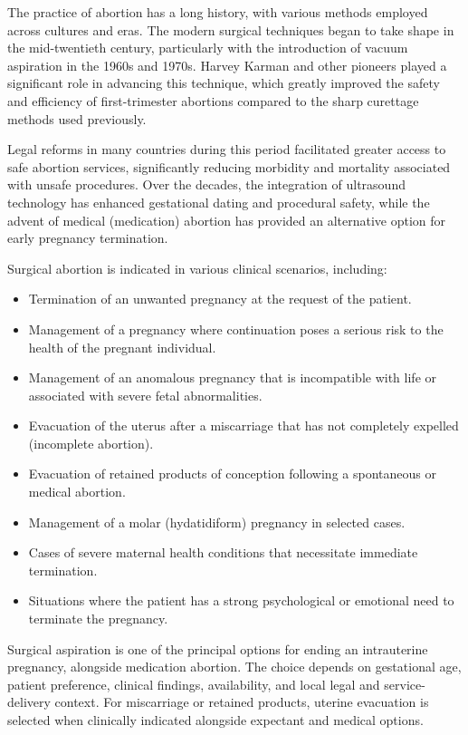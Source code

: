 The practice of abortion has a long history, with various methods employed across cultures and eras. The modern surgical techniques began to take shape in the mid-twentieth century, particularly with the introduction of vacuum aspiration in the 1960s and 1970s. Harvey Karman and other pioneers played a significant role in advancing this technique, which greatly improved the safety and efficiency of first-trimester abortions compared to the sharp curettage methods used previously. 

Legal reforms in many countries during this period facilitated greater access to safe abortion services, significantly reducing morbidity and mortality associated with unsafe procedures. Over the decades, the integration of ultrasound technology has enhanced gestational dating and procedural safety, while the advent of medical (medication) abortion has provided an alternative option for early pregnancy termination.

Surgical abortion is indicated in various clinical scenarios, including:

\begin{itemize}
  \item Termination of an unwanted pregnancy at the request of the patient.
  \item Management of a pregnancy where continuation poses a serious risk to the health of the pregnant individual.
  \item Management of an anomalous pregnancy that is incompatible with life or associated with severe fetal abnormalities.
  \item Evacuation of the uterus after a miscarriage that has not completely expelled (incomplete abortion).
  \item Evacuation of retained products of conception following a spontaneous or medical abortion.
  \item Management of a molar (hydatidiform) pregnancy in selected cases.
  \item Cases of severe maternal health conditions that necessitate immediate termination.
  \item Situations where the patient has a strong psychological or emotional need to terminate the pregnancy.
\end{itemize}

Surgical aspiration is one of the principal options for ending an intrauterine pregnancy, alongside medication abortion. The choice depends on gestational age, patient preference, clinical findings, availability, and local legal and service-delivery context. For miscarriage or retained products, uterine evacuation is selected when clinically indicated alongside expectant and medical options.

